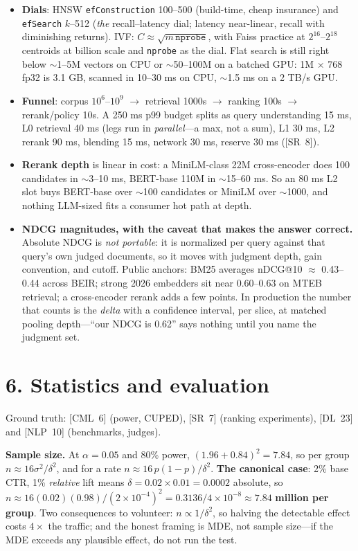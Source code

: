 \begin{itemize}[leftmargin=*,itemsep=1pt]
\item \textbf{Dials}: HNSW \texttt{efConstruction} 100--500 (build-time, cheap
insurance) and \texttt{efSearch} $k$--512 (\emph{the} recall--latency dial;
latency near-linear, recall with diminishing returns). IVF: $C \approx
\sqrt{m\,\texttt{nprobe}}$, with Faiss practice at $2^{16}$--$2^{18}$ centroids
at billion scale and \texttt{nprobe} as the dial. Flat search is still right
below $\sim$1--5M vectors on CPU or $\sim$50--100M on a batched GPU: 1M $\times$
768 fp32 is 3.1 GB, scanned in 10--30 ms on CPU, $\sim$1.5 ms on a 2 TB/s GPU.
\item \textbf{Funnel}: corpus $10^{6}$--$10^{9}$ $\rightarrow$ retrieval 1000s
$\rightarrow$ ranking 100s $\rightarrow$ rerank/policy 10s. A 250 ms p99 budget
splits as query understanding 15 ms, L0 retrieval 40 ms (legs run in
\emph{parallel}---a max, not a sum), L1 30 ms, L2 rerank 90 ms, blending 15 ms,
network 30 ms, reserve 30 ms ([SR~8]).
\item \textbf{Rerank depth} is linear in cost: a MiniLM-class 22M cross-encoder
does 100 candidates in $\sim$3--10 ms, BERT-base 110M in $\sim$15--60 ms. So an
80 ms L2 slot buys BERT-base over $\sim$100 candidates or MiniLM over
$\sim$1000, and nothing LLM-sized fits a consumer hot path at depth.
\item \textbf{NDCG magnitudes, with the caveat that makes the answer correct.}
Absolute NDCG is \emph{not portable}: it is normalized per query against that
query's own judged documents, so it moves with judgment depth, gain convention,
and cutoff. Public anchors: BM25 averages nDCG@10 $\approx$ 0.43--0.44 across
BEIR; strong 2026 embedders sit near 0.60--0.63 on MTEB retrieval; a
cross-encoder rerank adds a few points. In production the number that counts is
the \emph{delta} with a confidence interval, per slice, at matched pooling
depth---``our NDCG is 0.62'' says nothing until you name the judgment set.
\end{itemize}

\section*{6. Statistics and evaluation}

\noindent Ground truth: [CML~6] (power, CUPED), [SR~7] (ranking experiments),
[DL~23] and [NLP~10] (benchmarks, judges).

\textbf{Sample size.} At $\alpha = 0.05$ and 80\% power,
$(1.96 + 0.84)^{2} = 7.84$, so per group $n \approx 16\sigma^{2}/\delta^{2}$,
and for a rate $n \approx 16\,p(1-p)/\delta^{2}$. \textbf{The canonical case}:
2\% base CTR, 1\% \emph{relative} lift means $\delta = 0.02 \times 0.01 =
0.0002$ absolute, so $n \approx 16(0.02)(0.98)/(2{\times}10^{-4})^{2} =
0.3136/4{\times}10^{-8} \approx \mathbf{7.84}$ \textbf{million per group}. Two
consequences to volunteer: $n \propto 1/\delta^{2}$, so halving the detectable
effect costs $4\times$ the traffic; and the honest framing is MDE, not sample
size---if the MDE exceeds any plausible effect, do not run the test.

